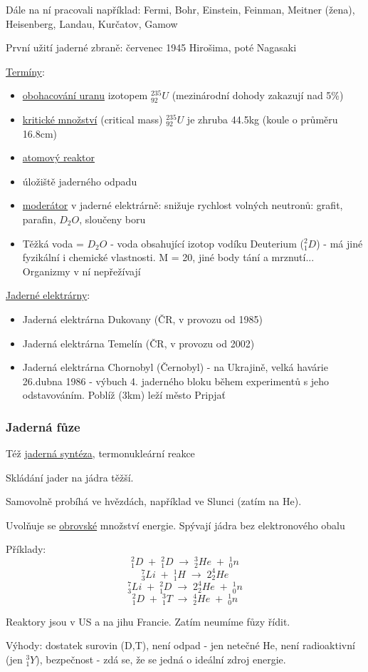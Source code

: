 Dále na ní pracovali například: Fermi, Bohr, Einstein, Feinman, Meitner (žena), Heisenberg, Landau, Kurčatov, Gamow 

První užití jaderné zbraně: červenec 1945 Hirošima, poté Nagasaki

\vspace{1em}
\underline{Termíny}:
\begin{itemize}
    \item \underline{obohacování uranu} izotopem $^{235}_{92}U$ (mezinárodní dohody zakazují nad 5\%)
    \item \underline{kritické množství} (critical mass) $^{235}_{92}U$ je zhruba 44.5kg (koule o průměru 16.8cm)
    \item \underline{atomový reaktor}
    \item úložiště jaderného odpadu
    \item \underline{moderátor} v jaderné elektrárně: snižuje rychlost volných neutronů: grafit, parafin, $D_2O$, sloučeny boru
    \item Těžká voda = $D_2O$ - voda obsahující izotop vodíku Deuterium ($^2_1D$) - má jiné fyzikální i chemické vlastnosti. M = 20, jiné body tání a mrznutí... Organizmy v ní nepřežívají
\end{itemize}

\underline{Jaderné elektrárny}:
\begin{itemize}
    \item Jaderná elektrárna Dukovany (ČR, v provozu od 1985)
    \item Jaderná elektrárna Temelín (ČR, v provozu od 2002)
    
    \item Jaderná elektrárna Chornobyl (Černobyl) - na Ukrajině, velká havárie 26.dubna 1986 - výbuch 4. jaderného bloku během experimentů s jeho odstavováním.
    Poblíž (3km) leží město Pripjať
\end{itemize}

\subsubsection{Jaderná fůze}
Též \underline{jaderná syntéza}, termonukleární reakce

Skládání jader na jádra těžší.

Samovolně probíhá ve hvězdách, například ve Slunci (zatím na He).

Uvolňuje se \underline{obrovské} množství energie. Spývají jádra bez elektronového obalu

\vspace{1em}
Příklady:
\[^2_1D \; + \; ^2_1D \; \longrightarrow \; ^3_2He \; + \; ^1_0n\]
\[^7_3Li \; + \; ^1_1H \; \longrightarrow \; 2^4_2He\]
\[^7_3Li \; + \; ^2_1D \; \longrightarrow \; 2^4_2He \; + \; ^1_0n\]
\[^2_1D \; + \; ^3_1T \; \longrightarrow \; ^4_2He \; + \; ^1_0n\]

\vspace{1em}
Reaktory jsou v US a na jihu Francie. Zatím neumíme fůzy řídit.

\vspace{1em}

Výhody: dostatek surovin (D,T), není odpad - jen netečné He, není radioaktivní (jen $^3_1Y$), bezpečnost - zdá se, že se jedná o ideální zdroj energie.